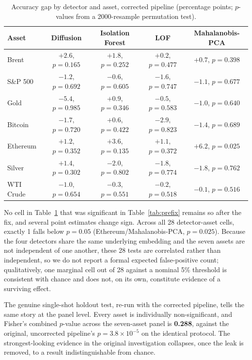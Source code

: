\documentclass[preprint,12pt]{elsarticle}
\begin{document}
\begin{table}[h]
\centering
\caption{Accuracy gap by detector and asset, corrected pipeline (percentage points; $p$-values from a 2000-resample permutation test).}
\label{tab:postfix}
\footnotesize
\setlength{\tabcolsep}{4pt}
\begin{tabular}{@{}lcccc@{}}
\toprule
Asset & Diffusion & Isolation Forest & LOF & Mahalanobis-PCA \\
\midrule
Brent & $+2.6$, $p=0.165$ & $+1.8$, $p=0.252$ & $+0.2$, $p=0.477$ & $+0.7$, $p=0.398$ \\
S\&P 500 & $-1.2$, $p=0.692$ & $-0.6$, $p=0.605$ & $-1.6$, $p=0.747$ & $-1.1$, $p=0.677$ \\
Gold & $-5.4$, $p=0.985$ & $+0.9$, $p=0.346$ & $-0.5$, $p=0.583$ & $-1.0$, $p=0.640$ \\
Bitcoin & $-1.7$, $p=0.720$ & $+0.6$, $p=0.422$ & $-2.9$, $p=0.823$ & $-1.4$, $p=0.689$ \\
Ethereum & $+1.2$, $p=0.352$ & $+3.6$, $p=0.135$ & $+1.1$, $p=0.372$ & $+6.2$, $p=0.025$ \\
Silver & $+1.4$, $p=0.302$ & $-2.0$, $p=0.802$ & $-1.8$, $p=0.774$ & $-1.8$, $p=0.762$ \\
WTI Crude & $-1.0$, $p=0.654$ & $-0.3$, $p=0.551$ & $-0.2$, $p=0.518$ & $-0.1$, $p=0.516$ \\
\bottomrule
\end{tabular}
\end{table}

No cell in Table~\ref{tab:postfix} that was significant in Table~\ref{tab:prefix} remains so
after the fix, and several point estimates change sign. Across all 28 detector-asset cells,
exactly 1 falls below $p=0.05$ (Ethereum/Mahalanobis-PCA, $p=0.025$). Because the four
detectors share the same underlying embedding and the seven assets are not independent of one
another, these 28 tests are correlated rather than independent, so we do not report a formal
expected false-positive count; qualitatively, one marginal cell out of 28 against a nominal 5\%
threshold is consistent with chance and does not, on its own, constitute evidence of a
surviving effect.

The genuine single-shot holdout test, re-run with the corrected pipeline, tells the same story
at the panel level. Every asset is individually non-significant, and Fisher's combined
$p$-value across the seven-asset panel is \textbf{0.288}, against the original, uncorrected
pipeline's $p = 3.8\times 10^{-5}$ on the identical protocol. The strongest-looking evidence in
the original investigation collapses, once the leak is removed, to a result indistinguishable
from chance.
\end{document}
